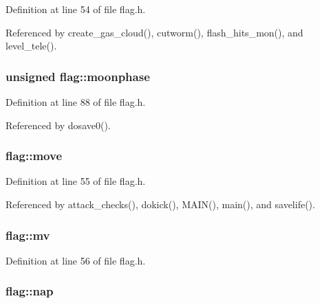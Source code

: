 Definition at line 54 of file flag.\+h.



Referenced by create\+\_\+gas\+\_\+cloud(), cutworm(), flash\+\_\+hits\+\_\+mon(), and level\+\_\+tele().

\hypertarget{structflag_a238ee0e647aca6e3eb9b3fc8cc4f1de5}{
\subsubsection[{moonphase}]{\setlength{\rightskip}{0pt plus 5cm}unsigned flag\+::moonphase}}\label{structflag_a238ee0e647aca6e3eb9b3fc8cc4f1de5}


Definition at line 88 of file flag.\+h.



Referenced by dosave0().

\hypertarget{structflag_ae91760a156a6d1949297a53272137325}{
\subsubsection[{move}]{ flag\+::move}}\label{structflag_ae91760a156a6d1949297a53272137325}


Definition at line 55 of file flag.\+h.



Referenced by attack\+\_\+checks(), dokick(), M\+A\+I\+N(), main(), and savelife().

\hypertarget{structflag_aa798d60aa184b3d48964fe6fc77a7c2e}{
\subsubsection[{mv}]{ flag\+::mv}}\label{structflag_aa798d60aa184b3d48964fe6fc77a7c2e}


Definition at line 56 of file flag.\+h.

\hypertarget{structflag_aeff133b7a26efd03a2413ceefd77e52d}{
\subsubsection[{nap}]{ flag\+::nap}}\label{structflag_aeff133b7a26efd03a2413ceefd77e52d}


